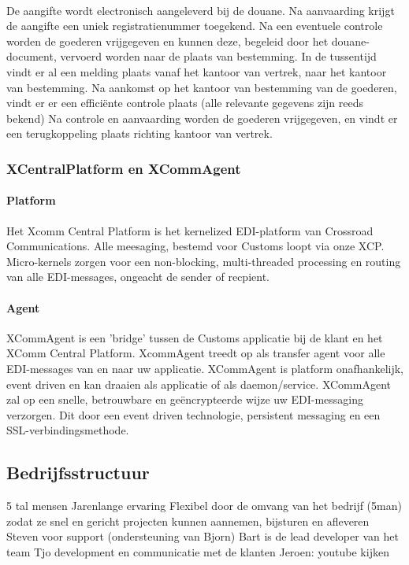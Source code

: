 \paragraph {} De aangifte wordt electronisch aangeleverd bij de douane. Na aanvaarding krijgt de
aangifte een uniek registratienummer toegekend. Na een eventuele controle worden de
goederen vrijgegeven en kunnen deze, begeleid door het douane-document, vervoerd worden
naar de plaats van bestemming. In de tussentijd vindt er al een melding plaats vanaf het
kantoor van vertrek, naar het kantoor van bestemming. Na aankomst op het kantoor van
bestemming van de goederen, vindt er er een efficiënte controle plaats (alle relevante
gegevens zijn reeds bekend) Na controle en aanvaarding worden de goederen vrijgegeven, en
vindt er een terugkoppeling plaats richting kantoor van vertrek.


\subsubsection {XCentralPlatform en XCommAgent}

\paragraph {Platform} Het Xcomm Central Platform is het kernelized EDI-platform van Crossroad
Communications. Alle meesaging, bestemd voor Customs loopt via onze XCP. Micro-kernels
zorgen voor een non-blocking, multi-threaded processing en routing van alle EDI-messages,
ongeacht de sender of recpient.

\paragraph {Agent} XCommAgent is een 'bridge' tussen de Customs applicatie bij de klant en
het XComm Central Platform. XcommAgent treedt op als transfer agent voor alle EDI-messages
van en naar uw applicatie. XCommAgent is platform onafhankelijk, event driven en kan
draaien als applicatie of als daemon/service.  XCommAgent zal op een snelle, betrouwbare
en geëncrypteerde wijze uw EDI-messaging verzorgen. Dit door een event driven technologie,
persistent messaging en een SSL-verbindingsmethode.


\subsection {Bedrijfsstructuur}

5 tal mensen
Jarenlange ervaring
Flexibel door de omvang van het bedrijf (5man) zodat ze snel en gericht projecten kunnen
aannemen, bijsturen en afleveren
Steven voor support (ondersteuning van Bjorn)
Bart is de lead developer van het team
Tjo development en communicatie met de klanten
Jeroen: youtube kijken

